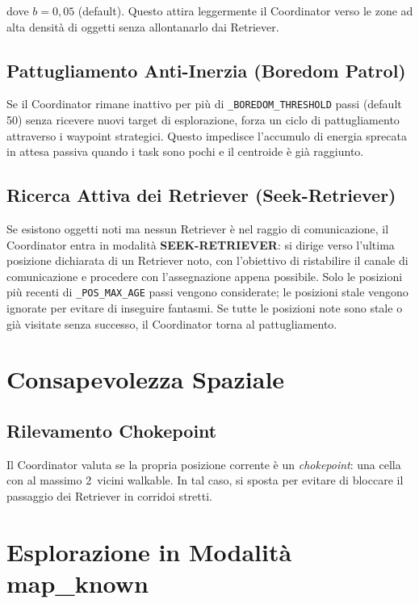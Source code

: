 dove $b = 0{,}05$ (default). Questo attira leggermente il Coordinator verso le zone
ad alta densit\`a di oggetti senza allontanarlo dai Retriever.

\subsection{Pattugliamento Anti-Inerzia (Boredom Patrol)}

Se il Coordinator rimane inattivo per pi\`u di \texttt{\_BOREDOM\_THRESHOLD} passi
(default 50) senza ricevere nuovi target di esplorazione, forza un ciclo di
pattugliamento attraverso i waypoint strategici. Questo impedisce l'accumulo di
energia sprecata in attesa passiva quando i task sono pochi e il centroide \`e gi\`a
raggiunto.

\subsection{Ricerca Attiva dei Retriever (Seek-Retriever)}

Se esistono oggetti noti ma nessun Retriever \`e nel raggio di comunicazione, il Coordinator
entra in modalit\`a \textbf{SEEK-RETRIEVER}: si dirige verso l'ultima posizione dichiarata
di un Retriever noto, con l'obiettivo di ristabilire il canale di comunicazione e procedere
con l'assegnazione appena possibile. Solo le posizioni pi\`u recenti di
\texttt{\_POS\_MAX\_AGE} passi vengono considerate; le posizioni stale vengono ignorate
per evitare di inseguire fantasmi. Se tutte le posizioni note sono stale o gi\`a visitate
senza successo, il Coordinator torna al pattugliamento.

\section{Consapevolezza Spaziale}

\subsection{Rilevamento Chokepoint}

Il Coordinator valuta se la propria posizione corrente \`e un \textit{chokepoint}:
una cella con al massimo 2~vicini walkable. In tal caso, si sposta per evitare di
bloccare il passaggio dei Retriever in corridoi stretti.

\section{Esplorazione in Modalit\`a map\_known}

